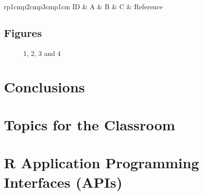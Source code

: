 \centering
\begin{table}[H]\footnotesize
	\caption{}
	\begin{tabular}{rp{1cm}p{2cm}p{3cm}p{1cm}}
		\hline
		ID & A & B & C & Reference \\
		\hline
		\hline
	\end{tabular}
\end{table}
\raggedright

\subsection{Figures}

\begin{figure}[H]
	\centering
	\begin{minipage}[b]{0.5\linewidth}
	\end{minipage}\hfill
	\begin{minipage}[b]{0.5\linewidth}
	\end{minipage}\hfill	
	\begin{minipage}[b]{0.5\linewidth}
	\end{minipage}\hfill
	\begin{minipage}[b]{0.5\linewidth}
	\end{minipage}\hfill
	\caption{1, 2, 3 and 4}
	\label{fig:Figure1}
\end{figure} 

\section{Conclusions}


\section{Topics for the Classroom}

\begin{enumerate}
\end{enumerate}

\section{R Application Programming Interfaces (APIs)}




